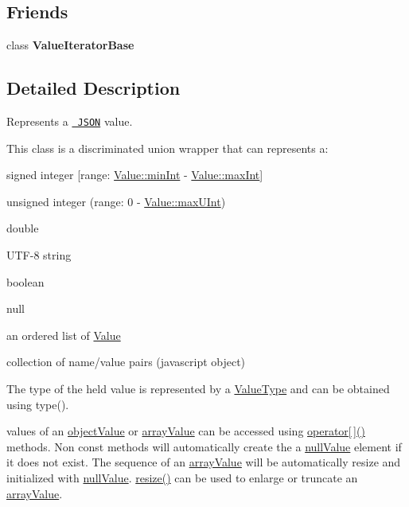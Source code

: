 \subsection*{Friends}
\begin{DoxyCompactItemize}
\item 
\mbox{\label{class_json_1_1_value_ad016df56489e5d360735457afba2f649}} 
class {\bfseries Value\+Iterator\+Base}
\end{DoxyCompactItemize}


\subsection{Detailed Description}
Represents a \href{http://www.json.org}{\texttt{ J\+S\+ON}} value. 

This class is a discriminated union wrapper that can represents a\+:
\begin{DoxyItemize}
\item signed integer \mbox{[}range\+: \mbox{\hyperlink{class_json_1_1_value_a7df8a39e2502b8c92a6a41e3d752d2c8}{Value\+::min\+Int}} -\/ \mbox{\hyperlink{class_json_1_1_value_a978c799a8af3114ef7dab6fd0a310a1b}{Value\+::max\+Int}}\mbox{]}
\item unsigned integer (range\+: 0 -\/ \mbox{\hyperlink{class_json_1_1_value_ac79e63ee68d3aa914bfd6988be669b87}{Value\+::max\+U\+Int}})
\item double
\item U\+T\+F-\/8 string
\item boolean
\item \textquotesingle{}null\textquotesingle{}
\item an ordered list of \mbox{\hyperlink{class_json_1_1_value}{Value}}
\item collection of name/value pairs (javascript object)
\end{DoxyItemize}

The type of the held value is represented by a \mbox{\hyperlink{namespace_json_a7d654b75c16a57007925868e38212b4e}{Value\+Type}} and can be obtained using type().

values of an \mbox{\hyperlink{namespace_json_a7d654b75c16a57007925868e38212b4eae8386dcfc36d1ae897745f7b4f77a1f6}{object\+Value}} or \mbox{\hyperlink{namespace_json_a7d654b75c16a57007925868e38212b4eadc8f264f36b55b063c78126b335415f4}{array\+Value}} can be accessed using \mbox{\hyperlink{class_json_1_1_value_a9cca2c37d854443604b678f2236527ad}{operator\mbox{[}$\,$\mbox{]}()}} methods. Non const methods will automatically create the a \mbox{\hyperlink{namespace_json_a7d654b75c16a57007925868e38212b4ea7d9899633b4409bd3fc107e6737f8391}{null\+Value}} element if it does not exist. The sequence of an \mbox{\hyperlink{namespace_json_a7d654b75c16a57007925868e38212b4eadc8f264f36b55b063c78126b335415f4}{array\+Value}} will be automatically resize and initialized with \mbox{\hyperlink{namespace_json_a7d654b75c16a57007925868e38212b4ea7d9899633b4409bd3fc107e6737f8391}{null\+Value}}. \mbox{\hyperlink{class_json_1_1_value_aa284353271ada427dbfa04a42f2be407}{resize()}} can be used to enlarge or truncate an \mbox{\hyperlink{namespace_json_a7d654b75c16a57007925868e38212b4eadc8f264f36b55b063c78126b335415f4}{array\+Value}}.

